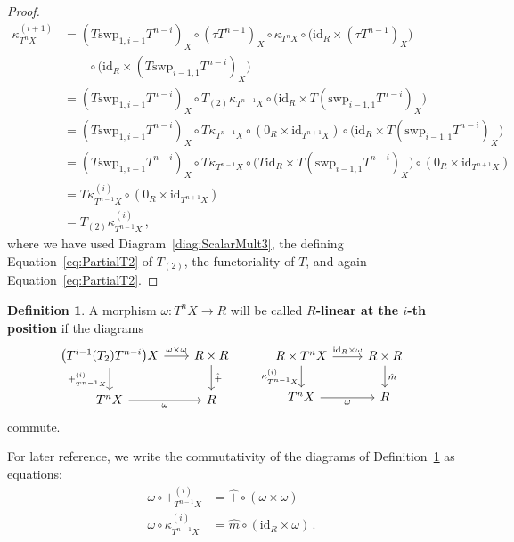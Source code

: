 \documentclass[12pt,reqno, a4paper]{amsart}
\numberwithin{equation}{section}
\theoremstyle{plain}
\theoremstyle{definition}
\newtheorem{Definition}[Theorem]{Definition}
\theoremstyle{remark}
\newcommand{\id}{\mathrm{id}}
\newcommand{\Rmult}{\hat{m}}
\newcommand{\Radd}{\hat{+}}
\newcommand{\Swp}{\mathrm{swp}}
\begin{document}
\begin{proof}
\begin{equation*}
\begin{split}
  \kappa^{(i+1)}_{T^n X}
  &=
  (T\Swp_{1,i-1}T^{n-i})_X \circ
  (\tau T^{n-1})_X \circ \kappa_{T^n X} \circ
  \bigl(\id_R \times (\tau T^{n-1})_X \bigr)
  \\
  &\qquad{}
  \circ
  \bigl(\id_R \times (T\Swp_{i-1,1}T^{n-i})_X \bigr)
  \\
  &=
  (T\Swp_{1,i-1}T^{n-i})_X \circ
  T_{(2)}\kappa_{T^{n-1} X} \circ
  \bigl(\id_R \times T(\Swp_{i-1,1}T^{n-i})_X \bigr)
  \\
  &=
  (T\Swp_{1,i-1}T^{n-i})_X \circ
  T\kappa_{T^{n-1} X} \circ
  (0_R \times \id_{T^{n+1} X}) \circ
  \bigl(\id_R \times T(\Swp_{i-1,1}T^{n-i})_X \bigr)
  \\
  &=
  (T\Swp_{1,i-1}T^{n-i})_X \circ
  T\kappa_{T^{n-1} X} \circ
  \bigl(T\id_R \times T(\Swp_{i-1,1}T^{n-i})_X \bigr) \circ
  (0_R \times \id_{T^{n+1} X})
  \\
  &=
  T\kappa^{(i)}_{T^{n-1}X} \circ
  (0_R \times \id_{T^{n+1} X})
  \\
  &=
  T_{(2)}\kappa^{(i)}_{T^{n-1}X}
  \,,
\end{split}
\end{equation*}
where we have used Diagram~\eqref{diag:ScalarMult3}, the defining Equation~\eqref{eq:PartialT2} of $T_{(2)}$, the functoriality of $T$, and again Equation~\eqref{eq:PartialT2}.
\end{proof}

\begin{Definition}
\label{def:CubeFormAti}
A morphism $\omega\colon T^n X \to R$ will be called \textbf{$R$-linear at the $i$-th position} if the diagrams
\begin{equation}
\label{diag:CubForm1and2}
\begin{tikzcd}[column sep=2em]
\bigl( T^{i-1} (T_2) T^{n-i} \bigr)X
\ar[d, "+^{(i)}_{T^{n-1}X}"']
\ar[r, "\omega \times \omega"]
&
R \times R
\ar[d, "\Radd"]
\\
T^n X
\ar[r, "\omega"']
&
R
\end{tikzcd}
\qquad
\begin{tikzcd}
R \times T^n X
\ar[d, "\kappa^{(i)}_{T^{n-1}X}"']
\ar[r, "{\id_R \times \omega}"]
&
R \times R
\ar[d, "\Rmult"]
\\
T^n X
\ar[r, "\omega"']
&
R
\end{tikzcd}
\end{equation}
commute.
\end{Definition}

For later reference, we write the commutativity of the diagrams of Definition~\ref{def:CubeFormAti} as equations:
\begin{align}
\label{eq:CubForm1}
  \omega \circ {+^{(i)}_{T^{n-1}X}}
  &= \Radd \circ (\omega \times \omega)
  \\
\label{eq:CubForm2}
  \omega \circ \kappa^{(i)}_{T^{n-1}X}
  &= \Rmult \circ (\id_R \times \omega)
  \,.
\end{align}
\end{document}
